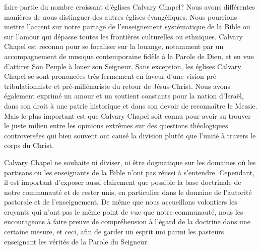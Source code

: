 
 faire partie du nombre croissant d'églises Calvary Chapel?
 Nous avons différentes manières de nous distinguer des autres églises évangéliques.
 Nous pourrions mettre l'accent sur notre partage de l'enseignement systématique de la Bible
 ou sur l'amour qui dépasse toutes les frontières culturelles ou ethniques.
Calvary Chapel est reconnu pour se focaliser sur la louange,
 notamment par un accompagnement de musique contemporaine fidèle à la Parole de Dieu,
 et en vue d'attirer Son Peuple à louer son Seigneur.
 Sans exception, les églises Calvary Chapel se sont prononcées très fermement
 en faveur d'une vision pré-tribulationniste et pré-millénariste du retour de Jésus-Christ.
Nous avons également exprimé un amour et un soutient constants pour la nation d'Israël,
 dans son droit à une patrie historique  et dans son devoir de reconnaître le Messie.
 Mais le plus important est que Calvary Chapel soit connu pour avoir su trouver
 le juste milieu entre les opinions extrêmes sur des questions théologiques
 controversées qui bien souvent ont causé la division plutôt que l'unité
 à travers le corps du Christ.

Calvary Chapel ne souhaite ni diviser, ni être dogmatique sur les domaines où les partisans
 ou les enseignants de la Bible n'ont pas réussi à s'entendre.
 Cependant, il est important d'exposer aussi clairement que possible la base doctrinale
 de notre communauté et de rester unis, en particulier dans le domaine de l'autorité pastorale
 et de l'enseignement. De même que nous accueillons volontiers les croyants qui n'ont pas
 le même point de vue que notre communauté, nous les encourageons à faire preuve de compréhension
 à l'égard de la doctrine dans une certaine mesure, et ceci, afin de garder un esprit uni
 parmi les pasteurs enseignant les vérités de la Parole du Seigneur.

